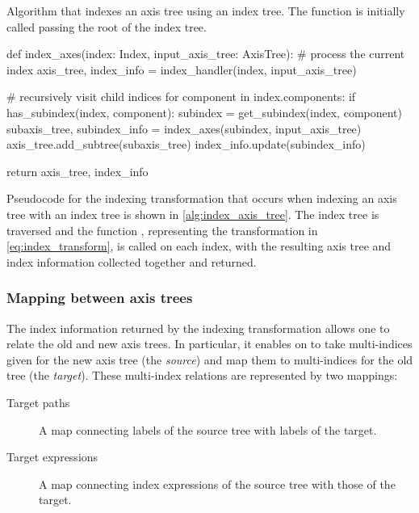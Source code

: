 \documentclass[thesis]{subfiles}
\begin{document}
\begin{algorithm}
  \caption{
    Algorithm that indexes an axis tree using an index tree.
    The function is initially called passing the root of the index tree.
  }

  \begin{flushright}
    \begin{minipage}{.96\textwidth}
  \begin{pyalg2}
    def index_axes(index: Index, input_axis_tree: AxisTree):
      # process the current index
      axis_tree, index_info = index_handler(index, input_axis_tree)

      # recursively visit child indices
      for component in index.components:
        if has_subindex(index, component):
          subindex = get_subindex(index, component)
          subaxis_tree, subindex_info = index_axes(subindex,
                                                   input_axis_tree)
          axis_tree.add_subtree(subaxis_tree)
          index_info.update(subindex_info)

      return axis_tree, index_info
  \end{pyalg2}
    \end{minipage}
  \end{flushright}

  \label{alg:index_axis_tree}
\end{algorithm}

Pseudocode for the indexing transformation that occurs when indexing an axis tree with an index tree is shown in \cref{alg:index_axis_tree}.
The index tree is traversed and the function , representing the transformation in \cref{eq:index_transform}, is called on each index, with the resulting axis tree and index information collected together and returned.

\subsubsection{Mapping between axis trees}

The index information returned by the indexing transformation allows one to relate the old and new axis trees.
In particular, it enables on to take multi-indices given for the new axis tree (the \emph{source}) and map them to multi-indices for the old tree (the \emph{target}).
These multi-index relations are represented by two mappings:
\begin{description}
  \item[Target paths] A map connecting labels of the source tree with labels of the target.
  \item[Target expressions] A map connecting index expressions of the source tree with those of the target.
\end{description}
\end{document}
